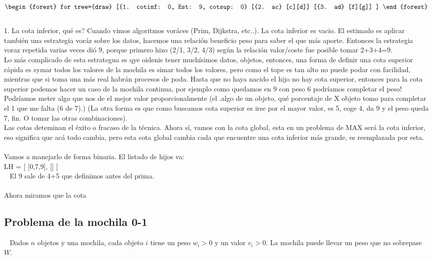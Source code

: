 \documentclass[tikz,11pt,fleqn]{book} %
\begin{document}
\begin{example}
    $$\begin{forest}
    for tree={draw}
        [{1. cotinf: 0, Est: 9, cotsup: 0}
            [{2. ac}
                [c][d]]
            [{3. ad}
                [f][g]]
        ]
    \end{forest}
    $$
    ~\\
    1. La cota inferior, qué es? Cuando vimos algoritmos voráces (Prim, Dijkstra, etc..). La cota inferior es vacio.
    El estimado es aplicar también una estrategia voráz sobre los datos, hacemos una relación beneficio peso para saber el que más aporte. Entonces la estrategia voraz repetida varias veces dió 9, porque primero hizo (2/1, 3/2, 4/3) según la relación valor/coste fue posible tomar 2+3+4=9.
    ~\\
    Lo más complicado de esta estrategua es qye oidenis tener muchísimos datos, objetos, entonces, una forma de definir una cota superior rápida es symar todos los valores de la mochila es simar todos los valores, pero como el tope es tan alto no puede podar con facilidad, mientras que si toma una más real habrán procesos de poda. Hasta que no haya nacido el hijo no hay cota superior, entonces para la cota superior podemos hacer un caso de la mochila continua, por ejemplo como quedamos en 9 con peso 6 podríamos completar el peso! Podríamos meter algo que nos de el mejor valor proporcionalmente (el .algo de un objeto, qué porcentaje de X objeto tomo para completar el 1 que me falta (6 de 7).) (La otra forma es que como buscamos cota superior es irse por el mayor valor, es 5, coge 4, da 9 y el peso queda 7, fin. O tomar las otras combinaciones).
    ~\\
    Las cotas deteminan el éxito o fracaso de la técnica. 
    Ahora sí, vamos con la cota global, esta en un problema de MAX será la cota inferior, eso significa que acá todo cambia, pero esta cota global cambia cada que encuentre una cota inferior más grande, es reemplazada por esta.
    ~\\
    Vamos a manejarlo de forma binaria.
    El listado de hijos va:
    ~\\
    LH = [ [0,7,9], [] ]\\~
    El 9 sale de 4+5 que definimos antes del prima.
    \\~\\
    Ahora miramos que la cota 
\end{example}


\subsection{Problema de la mochila 0-1}~
    Dados $n$ objetos y una mochila, cada objeto $i$ tiene un peso $w_i>0$ y un valor $v_i>0$. La mochila puede llevar un peso que no sobrepase $W$.
\end{document}
